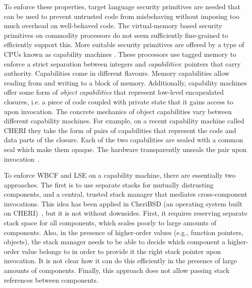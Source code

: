 \documentclass[acmsmall,screen]{acmart}\settopmatter{}
\begin{document}
To enforce these properties, target language security primitives are needed that can be used to prevent untrusted code from misbehaving without imposing too much overhead on well-behaved code.
The virtual-memory based security primitives on commodity processors do not seem sufficiently fine-grained to efficiently support this.
More suitable security primitives are offered by a type of CPUs known as capability machines \citep{levy_capability-based_1984,watson_cheri:_2015}.
These processors use tagged memory to enforce a strict separation between integers and {\itshape capabilities}: pointers that carry authority.
Capabilities come in different flavours.
Memory capabilities allow reading from and writing to a block of memory.
Additionally, capability machines offer some form of {\itshape object capabilities} that represent low-level encapsulated closures, i.e. a piece of code coupled with private state that it gains access to upon invocation.
The concrete mechanics of object capabilities vary between different capability machines.
For example, on a recent capability machine called CHERI they take the form of pairs of capabilities that represent the code and data parts of the closure.
Each of the two capabilities are sealed with a common seal which make them opaque.
The hardware transparently unseals the pair upon invocation~\citep{watson_capability_2015,watson_fast_2016}.

To enforce WBCF and LSE on a capability machine, there are essentially two approaches.
The first is to use separate stacks for mutually distrusting components, and a central, trusted stack manager that mediates cross-component invocations.
This idea has been applied in CheriBSD (an operating system built on CHERI)~\citep{watson_capability_2015}, but it is not without downsides.
First, it requires reserving separate stack space for all components, which scales poorly to large amounts of components.
Also, in the presence of higher-order values (e.g., function pointers, objects), the stack manager needs to be able to decide which component a higher-order value belongs to in order to provide it the right stack pointer upon invocation.
It is not clear how it can do this efficiently in the presence of large amounts of components.
Finally, this approach does not allow passing stack references between components.
\end{document}
